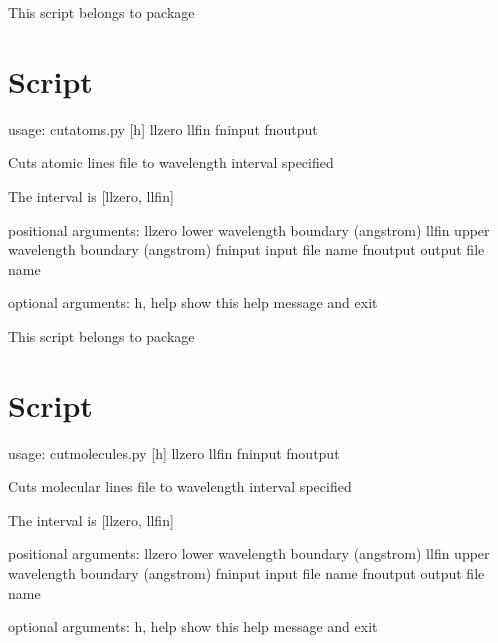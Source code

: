 \documentclass[letterpaper,10pt,english]{sphinxmanual}
\begin{document}
This script belongs to package 


\section{Script }
\label{\detokenize{autoscripts/script-cut-atoms::doc}}\label{\detokenize{autoscripts/script-cut-atoms:script-cut-atoms-py}}
\begin{sphinxVerbatim}[commandchars=\\\{\}]
usage: cut\PYGZhy{}atoms.py [\PYGZhy{}h] llzero llfin fn\PYGZus{}input fn\PYGZus{}output

Cuts atomic lines file to wavelength interval specified

The interval is [llzero, llfin]

positional arguments:
  llzero      lower wavelength boundary (angstrom)
  llfin       upper wavelength boundary (angstrom)
  fn\PYGZus{}input    input file name
  fn\PYGZus{}output   output file name

optional arguments:
  \PYGZhy{}h, \PYGZhy{}\PYGZhy{}help  show this help message and exit
\end{sphinxVerbatim}

This script belongs to package 


\section{Script }
\label{\detokenize{autoscripts/script-cut-molecules::doc}}\label{\detokenize{autoscripts/script-cut-molecules:script-cut-molecules-py}}
\begin{sphinxVerbatim}[commandchars=\\\{\}]
usage: cut\PYGZhy{}molecules.py [\PYGZhy{}h] llzero llfin fn\PYGZus{}input fn\PYGZus{}output

Cuts molecular lines file to wavelength interval specified

The interval is [llzero, llfin]

positional arguments:
  llzero      lower wavelength boundary (angstrom)
  llfin       upper wavelength boundary (angstrom)
  fn\PYGZus{}input    input file name
  fn\PYGZus{}output   output file name

optional arguments:
  \PYGZhy{}h, \PYGZhy{}\PYGZhy{}help  show this help message and exit
\end{sphinxVerbatim}
\end{document}
